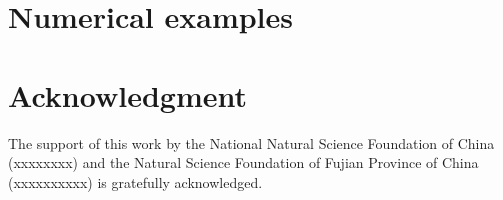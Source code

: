 \documentclass{elsarticle}
\begin{document}





\section{Numerical examples}

% 
% 

\section*{Acknowledgment}
The support of this work by the National Natural Science Foundation of China (xxxxxxxx) and the Natural Science Foundation of Fujian Province of China (xxxxxxxxxx) is gratefully acknowledged.
\appendix
                                       



\end{document}
